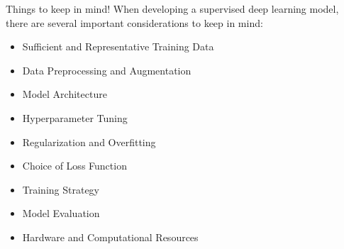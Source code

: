 \documentclass[10pt,aspectratio=169,dvipsnames]{beamer} %
\begin{document}
	
	\begin{frame}{Things to keep in mind!}
		When developing a supervised deep learning model, there are several important considerations to keep in mind:
		\begin{itemize}
			\item Sufficient and Representative Training Data
			\item Data Preprocessing and Augmentation
			\item Model Architecture
			\item Hyperparameter Tuning
			\item Regularization and Overfitting
			\item Choice of Loss Function
			\item Training Strategy
			\item Model Evaluation
			\item Hardware and Computational Resources	
		\end{itemize}
	\end{frame}
\end{document}
